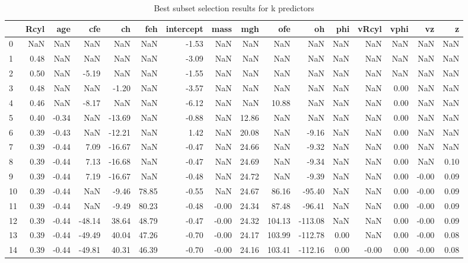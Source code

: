 \begin{table}[h!]
\caption{Best subset selection results for k predictors}
\label{tab:BestSubset}
\begin{tabular}{lrrrrrrrrrrrrrrr}
\toprule
 & Rcyl & age & cfe & ch & feh & intercept & mass & mgh & ofe & oh & phi & vRcyl & vphi & vz & z \\
\midrule
0 & NaN & NaN & NaN & NaN & NaN & -1.53 & NaN & NaN & NaN & NaN & NaN & NaN & NaN & NaN & NaN \\
1 & 0.48 & NaN & NaN & NaN & NaN & -3.09 & NaN & NaN & NaN & NaN & NaN & NaN & NaN & NaN & NaN \\
2 & 0.50 & NaN & -5.19 & NaN & NaN & -1.55 & NaN & NaN & NaN & NaN & NaN & NaN & NaN & NaN & NaN \\
3 & 0.48 & NaN & NaN & -1.20 & NaN & -3.57 & NaN & NaN & NaN & NaN & NaN & NaN & 0.00 & NaN & NaN \\
4 & 0.46 & NaN & -8.17 & NaN & NaN & -6.12 & NaN & NaN & 10.88 & NaN & NaN & NaN & 0.00 & NaN & NaN \\
5 & 0.40 & -0.34 & NaN & -13.69 & NaN & -0.88 & NaN & 12.86 & NaN & NaN & NaN & NaN & 0.00 & NaN & NaN \\
6 & 0.39 & -0.43 & NaN & -12.21 & NaN & 1.42 & NaN & 20.08 & NaN & -9.16 & NaN & NaN & 0.00 & NaN & NaN \\
7 & 0.39 & -0.44 & 7.09 & -16.67 & NaN & -0.47 & NaN & 24.66 & NaN & -9.32 & NaN & NaN & 0.00 & NaN & NaN \\
8 & 0.39 & -0.44 & 7.13 & -16.68 & NaN & -0.47 & NaN & 24.69 & NaN & -9.34 & NaN & NaN & 0.00 & NaN & 0.10 \\
9 & 0.39 & -0.44 & 7.19 & -16.67 & NaN & -0.48 & NaN & 24.72 & NaN & -9.39 & NaN & NaN & 0.00 & -0.00 & 0.09 \\
10 & 0.39 & -0.44 & NaN & -9.46 & 78.85 & -0.55 & NaN & 24.67 & 86.16 & -95.40 & NaN & NaN & 0.00 & -0.00 & 0.09 \\
11 & 0.39 & -0.44 & NaN & -9.49 & 80.23 & -0.48 & -0.00 & 24.34 & 87.48 & -96.41 & NaN & NaN & 0.00 & -0.00 & 0.09 \\
12 & 0.39 & -0.44 & -48.14 & 38.64 & 48.79 & -0.47 & -0.00 & 24.32 & 104.13 & -113.08 & NaN & NaN & 0.00 & -0.00 & 0.09 \\
13 & 0.39 & -0.44 & -49.49 & 40.04 & 47.26 & -0.70 & -0.00 & 24.17 & 103.99 & -112.78 & 0.00 & NaN & 0.00 & -0.00 & 0.08 \\
14 & 0.39 & -0.44 & -49.81 & 40.31 & 46.39 & -0.70 & -0.00 & 24.16 & 103.41 & -112.16 & 0.00 & -0.00 & 0.00 & -0.00 & 0.08 \\
\bottomrule
\end{tabular}
\end{table}
